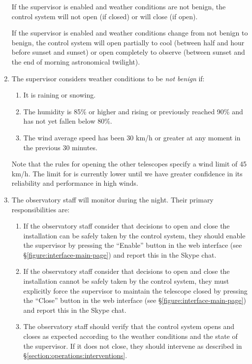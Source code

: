 \begin{enumerate}
If the supervisor is enabled and weather conditions are not benign, the control system will not open (if closed) or will close (if open).

If the supervisor is enabled and weather conditions change from not benign to benign, the control system will open partially to cool (between half and hour before sunset and sunset) or open completely to observe (between sunset and the end of morning astronomical twilight).

\item
The supervisor considers weather conditions to be \emph{not benign} if:
\begin{enumerate}
\item It is raining or snowing.
\item The humidity is 85\% or higher and rising or previously reached 90\% and has not yet fallen below 80\%.
\item The wind average speed has been 30 km/h or greater at any moment in the previous 30 minutes.  
\end{enumerate}
Note that the rules for opening the other telescopes specify a wind limit of 45 km/h. The limit for {\projectname} is currently lower until we have greater confidence in its reliability and performance in high winds.

\item
The observatory staff will monitor {\projectname} during the night. Their primary responsibilities are:
\begin{enumerate}
\item If the observatory staff consider that decisions to open and close the installation can be safely taken by the control system, they should enable the supervisor by pressing the “Enable” button in the web interface (see \S\ref{figure:interface-main-page}) and report this in the Skype chat.
\item If the observatory staff consider that decisions to open and close the installation cannot be safely taken by the control system, they must explicitly force the supervisor to maintain the telescope closed by pressing the “Close” button in the web interface (see \S\ref{figure:interface-main-page}) and report this in the Skype chat. 
\item
The observatory staff should verify that the control system opens and closes as expected according to the weather conditions and the state of the supervisor. If it does not close, they should intervene as described in \S\ref{section:operations:interventions}.


\end{enumerate}
\end{enumerate}
